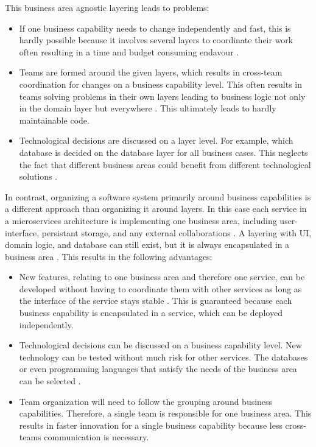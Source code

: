 This business area agnostic layering leads to problems:
\begin{itemize}
\item If one business capability needs to change independently and fast, this is hardly possible because it involves several layers to coordinate their work often resulting in a time and budget consuming endavour \cite{FowlerFowlerBusinessCap2014}.
\item Teams are formed around the given layers, which results in cross-team coordination for changes on a business capability level. 
This often results in teams solving problems in their own layers leading to business logic not only in the domain layer but everywhere \cite{FowlerFowlerBusinessCap2014}. This ultimately leads to hardly maintainable code. 
\item Technological decisions are discussed on a layer level. 
For example, which database is decided on the database layer for all business cases.
This neglects the fact that different business areas could benefit from different technological solutions \citep[p. 5]{Wolff2016}.
\end{itemize}

In contrast, organizing a software system primarily around business capabilities is a different approach than organizing it around layers.
In this case each service in a microservices architecture is implementing one business area, including user-interface, persistant storage, and any external collaborations \cite{FowlerFowlerBusinessCap2014}.
A layering with \ac{UI}, domain logic, and database can still exist, but it is always encapsulated in a business area \citep[p. 42]{Wolff2016}.
This results in the following advantages:
\begin{itemize}
\item  New features, relating to one business area and therefore one service, can be developed without having to coordinate them with other services as long as the interface of the service stays stable \citep[p. 21]{Wolff2016}. 
This is guaranteed because each business capability is encapsulated in a service, which can be deployed independently.
\item Technological decisions can be discussed on a business capability level.
New technology can be tested without much risk for other services.
The databases or even programming languages that satisfy the needs of the business area can be selected \citep[p. 5]{Wolff2016}.
\item Team organization will need to follow the grouping around business capabilities.
Therefore, a single team is responsible for one business area.
This results in faster innovation for a single business capability because less cross-teams communication is necessary.
\end{itemize}

